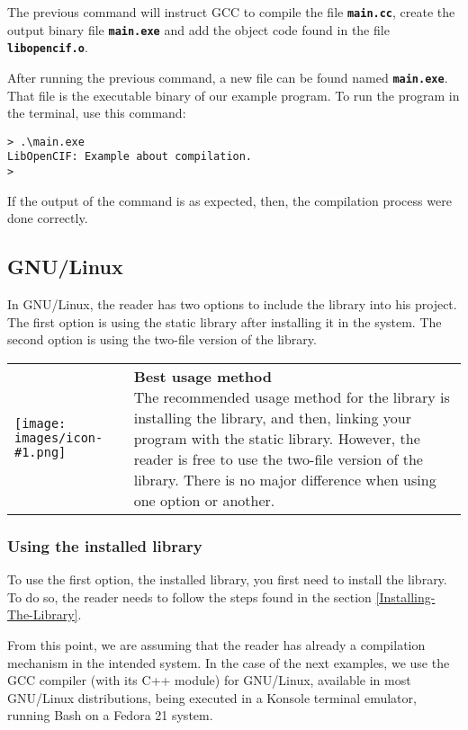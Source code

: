 \documentclass[11pt,twoside,openany,x11names,svgnames]{memoir}
\makeatletter
\newcommand{\IconNote}[3]
{
	\begin{table}[ht]
	\begin{tabular}{ lm{\dimexpr\textwidth-8\tabcolsep-\wd0}@{}}
		\toprule
		\texttt{[image: images/icon-\#1.png]}
		&
		\parbox[t]{155mm}{
		\textbf{#2} \\
		#3
		}
	\end{tabular}
\end{table}
}
\makeatother
\begin{document}
The previous command will instruct GCC to compile the file \textbf{\texttt{main.cc}}, create the output binary file \textbf{\texttt{main.exe}} and add the object code found in the file \textbf{\texttt{libopencif.o}}.

After running the previous command, a new file can be found named \textbf{\texttt{main.exe}}. That file is the executable binary of our example program. To run the program in the terminal, use this command:

\begin{lstlisting}[frame=single,style=SystemCommandStyle]
> .\main.exe
LibOpenCIF: Example about compilation.
>
\end{lstlisting}

If the output of the command is as expected, then, the compilation process were done correctly.

\subsection{GNU/Linux}\label{GNU-Linux}

In GNU/Linux, the reader has two options to include the library into his project. The first option is using the static library after installing it in the system. The second option is using the two-file version of the library.

\IconNote
	{info}
	{Best usage method}
	{The recommended usage method for the library is installing the library, and then, linking your program with the static library. However, the reader is free to use the two-file version of the library. There is no major difference when using one option or another.}
	
\subsubsection{Using the installed library}\label{Using-the-installed-library}
	
To use the first option, the installed library, you first need to install the library. To do so, the reader needs to follow the steps found in the section \ref{Installing-The-Library}.

From this point, we are assuming that the reader has already a compilation mechanism in the intended system. In the case of the next examples, we use the GCC compiler (with its C++ module) for GNU/Linux, available in most GNU/Linux distributions, being executed in a Konsole terminal emulator, running Bash on a Fedora 21 system.
\end{document}
